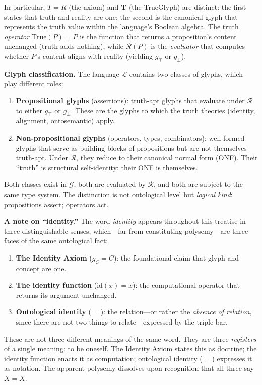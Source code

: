 \documentclass[12pt, letterpaper]{book}
\def\equiv{=}%
\def\mathfrak#1{#1}%
\begin{document}
\noindent In particular, $T \equiv R$ (the axiom) and $\mathbf{T}$ (the TrueGlyph) are distinct: the first states that truth and reality are one; the second is the canonical glyph that represents the truth value within the language's Boolean algebra. The truth \textit{operator} $\mathrm{True}(P) \equiv P$ is the function that returns a proposition's content unchanged (truth adds nothing), while $\mathcal{R}(P)$ is the \textit{evaluator} that computes whether $P$'s content aligns with reality (yielding $\mathfrak{g}_\top$ or $\mathfrak{g}_\bot$).

\medskip

\noindent\textbf{Glyph classification.} The language $\mathcal{L}$ contains two classes of glyphs, which play different roles:
\begin{enumerate}[label=(\roman*)]
    \item \textbf{Propositional glyphs} (assertions): truth-apt glyphs that evaluate under $\mathcal{R}$ to either $\mathfrak{g}_\top$ or $\mathfrak{g}_\bot$. These are the glyphs to which the truth theories (identity, alignment, ontosemantic) apply.
    \item \textbf{Non-propositional glyphs} (operators, types, combinators): well-formed glyphs that serve as building blocks of propositions but are not themselves truth-apt. Under $\mathcal{R}$, they reduce to their canonical normal form (ONF). Their ``truth'' is structural self-identity: their ONF is themselves.
\end{enumerate}
Both classes exist in $\mathcal{G}$, both are evaluated by $\mathcal{R}$, and both are subject to the same type system. The distinction is not ontological level but \textit{logical kind}: propositions assert; operators act.

\medskip

\noindent\textbf{A note on ``identity.''} The word \textit{identity} appears throughout this treatise in three distinguishable senses, which---far from constituting polysemy---are three faces of the same ontological fact:
\begin{enumerate}[label=(\roman*)]
    \item \textbf{The Identity Axiom} ($\mathfrak{g}_C \equiv C$): the foundational claim that glyph and concept are one.
    \item \textbf{The identity function} ($\mathrm{id}(x) = x$): the computational operator that returns its argument unchanged.
    \item \textbf{Ontological identity} ($\equiv$): the relation---or rather the \textit{absence of relation}, since there are not two things to relate---expressed by the triple bar.
\end{enumerate}
These are not three different meanings of the same word. They are three \textit{registers} of a single meaning: to be oneself. The Identity Axiom states this as doctrine; the identity function enacts it as computation; ontological identity ($\equiv$) expresses it as notation. The apparent polysemy dissolves upon recognition that all three say $X \equiv X$.
\end{document}
